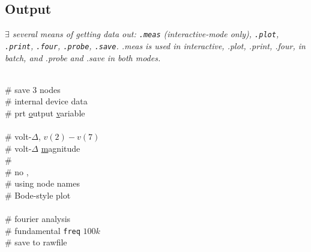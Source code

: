 \subsection*{Output}
\textit{$\exists$ several means of getting data out: \texttt{.meas} (interactive-mode only), \texttt{.plot}, \texttt{.print}, \texttt{.four}, \texttt{.probe}, \texttt{.save}. .meas is used in interactive, .plot, .print, .four, in batch, and .probe and .save in both modes.}


 \\
 \# {\scriptsize save 3 nodes}\\
 \# {\scriptsize internal device data}\\[1mm]

 \# {\scriptsize prt \underline{o}utput \underline{v}ariable }\\
 \\
 \# {\scriptsize volt-$\Delta$, $v(2)-v(7)$}\\
 \# {\scriptsize volt-$\Delta$ \underline{m}agnitude}\\[1mm]

 \# {\scriptsize }\\
 \# {\scriptsize no , }\\
 \# {\scriptsize using node names}\\
 \# {\scriptsize Bode-style plot}\\
  {\scriptsize }\\[1mm]

 \# {\scriptsize fourier analysis}\\
 \# {\scriptsize  fundamental \texttt{freq} $100k$}\\[1mm]

 \# {\scriptsize save to rawfile}\\
 \\[1mm]

